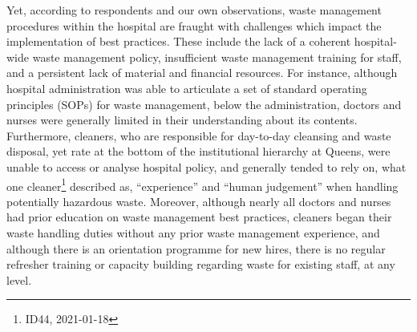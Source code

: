 \documentclass[
  authoryear,
  review,
  3p]{elsarticle}
\begin{document}
Yet, according to respondents and our own observations, waste management
procedures within the hospital are fraught with challenges which impact
the implementation of best practices. These include the lack of a
coherent hospital-wide waste management policy, insufficient waste
management training for staff, and a persistent lack of material and
financial resources. For instance, although hospital administration was
able to articulate a set of standard operating principles (SOPs) for
waste management, below the administration, doctors and nurses were
generally limited in their understanding about its contents.
Furthermore, cleaners, who are responsible for day-to-day cleansing and
waste disposal, yet rate at the bottom of the institutional hierarchy at
Queens, were unable to access or analyse hospital policy, and generally
tended to rely on, what one cleaner\footnote{ID44, 2021-01-18} described
as, ``experience'' and ``human judgement'' when handling potentially
hazardous waste. Moreover, although nearly all doctors and nurses had
prior education on waste management best practices, cleaners began their
waste handling duties without any prior waste management experience, and
although there is an orientation programme for new hires, there is no
regular refresher training or capacity building regarding waste for
existing staff, at any level.
\end{document}

